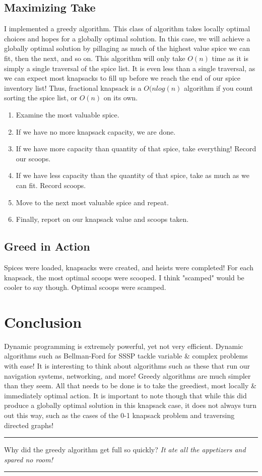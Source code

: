 \documentclass[letterpaper, 10pt]{article}
\begin{document}
\subsection{Maximizing Take}
I implemented a greedy algorithm. This class of algorithm takes locally optimal choices and hopes for a globally optimal solution. In this case, we will achieve a globally optimal solution by pillaging as much of the highest value spice we can fit, then the next, and so on. This algorithm will only take $O(n)$ time as it is simply a single traversal of the spice list. It is even less than a single traversal, as we can expect most knapsacks to fill up before we reach the end of our spice inventory list! Thus, fractional knapsack is a $O(nlog(n)$ algorithm if you count sorting the spice list, or $O(n)$ on its own.
\begin{enumerate}
    \item Examine the most valuable spice.
    \item If we have no more knapsack capacity, we are done.
    \item If we have more capacity than quantity of that spice, take everything! Record our scoops.
    \item If we have less capacity than the quantity of that spice, take as much as we can fit. Record scoops.
    \item Move to the next most valuable spice and repeat.
    \item Finally, report on our knapsack value and scoops taken.
\end{enumerate}


\subsection{Greed in Action}
Spices were loaded, knapsacks were created, and heists were completed! For each knapsack, the most optimal scoops were scooped. I think "scamped" would be cooler to say though. Optimal scoops were scamped.


\section{Conclusion}
Dynamic programming is extremely powerful, yet not very efficient. Dynamic algorithms such as Bellman-Ford for SSSP tackle variable \& complex problems with ease! It is interesting to think about algorithms such as these that run our navigation systems, networking, and more!
\newline Greedy algorithms are much simpler than they seem. All that needs to be done is to take the greediest, most locally \& immediately optimal action. It is important to note though that while this did produce a globally optimal solution in this knapsack case, it does not always turn out this way, such as the cases of the 0-1 knapsack problem and traversing directed graphs!
\\
\hrule
\vspace{.25cm}
Why did the greedy algorithm get full so quickly? \textit{It ate all the appetizers and spared no room!}
\vspace{.25cm}
\hrule
\end{document}
